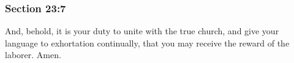 	\subsubsection{Section 23:7} %
		\label{DC23-7}

		And, behold, it is your duty to unite with the true church, and give your language to exhortation continually, that you may receive the reward of the laborer. Amen.

